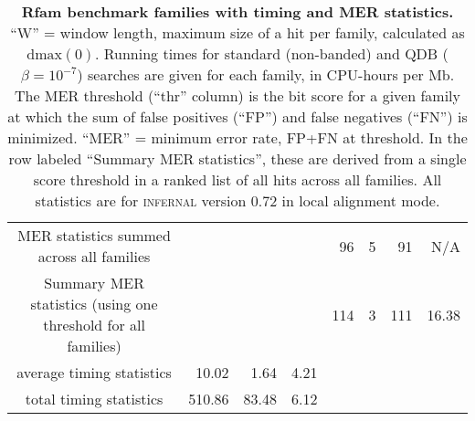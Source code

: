 \begin{table}
\begin{center}
\begin{tabular}{|ll|rr|rr|r|rr|rrrr|}
\multicolumn{6}{|c}{MER statistics summed across all families}                     & \multicolumn{3}{c|}{} & 96 & 5 & 91 & N/A \\  
\multicolumn{6}{|c}{Summary MER statistics (using one threshold for all families)} & \multicolumn{3}{c|}{} & 114 & 3 & 111 &  16.38 \\ \hline
\multicolumn{6}{|c|}{average timing statistics} & 10.02   & 1.64  & 4.21 & \multicolumn{4}{c}{} \\ 
\multicolumn{6}{|c|}{total timing statistics}   & 510.86 & 83.48 & 6.12 & \multicolumn{4}{c}{} \\ \cline{1-9}

\end{tabular}
\end{center}

\caption{\textbf{Rfam benchmark families with timing and MER statistics.}
  ``W'' = window length, maximum size of a hit per family, calculated
  as $\mbox{dmax}(0)$.  Running times for standard (non-banded) and
  QDB ($\beta=10^{-7}$) searches are given for each family, in
  CPU-hours per Mb.  The MER threshold (``thr'' column) is the bit
  score for a given family at which the sum of false positives (``FP'')
  and false negatives (``FN'') is minimized. ``MER'' = minimum error
  rate, FP+FN at threshold.  In the row labeled ``Summary MER statistics'', these are
  derived from a single score threshold in a ranked list of all hits
  across all families. All statistics are for \textsc{infernal}
  version 0.72 in local alignment mode.}

\label{tbl:rmark}
\end{table}
